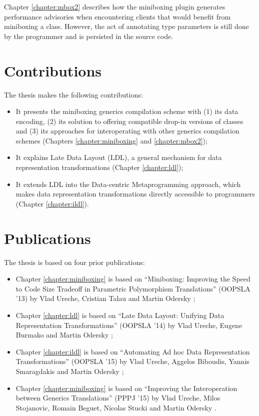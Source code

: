 Chapter \ref{chapter:mbox2} describes how the miniboxing plugin generates performance advisories when encountering clients that would benefit from miniboxing a class. However, the act of annotating type parameters is still done by the programmer and is persisted in the source code.

\section{Contributions}

The thesis makes the following contributions:

\begin{itemize}
  \item It presents the miniboxing generics compilation scheme with (1) its data encoding, (2) its solution to offering compatible drop-in versions of classes and (3) its approaches for interoperating with other generics compilation schemes (Chapters \ref{chapter:miniboxing} and \ref{chapter:mbox2});
  \item It explains Late Data Layout (LDL), a general mechanism for data representation transformations (Chapter \ref{chapter:ldl});
  \item It extends LDL into the Data-centric Metaprogramming approach, which makes data representation transformations directly accessible to programmers (Chapter \ref{chapter:ildl}).
\end{itemize}

\section{Publications}

The thesis is based on four prior publications:

\begin{itemize}
  \item Chapter \ref{chapter:miniboxing} is based on ``Miniboxing: Improving the Speed to Code Size Tradeoff in Parametric Polymorphism Translations'' (OOPSLA '13) by Vlad Ureche, Cristian Talau and Martin Odersky \cite{miniboxing};
  \item Chapter \ref{chapter:ldl} is based on ``Late Data Layout: Unifying Data Representation Transformations'' (OOPSLA '14) by Vlad Ureche, Eugene Burmako and Martin Odersky \cite{ldl};
  \item Chapter \ref{chapter:ildl} is based on ``Automating Ad hoc Data Representation Transformations'' (OOPSLA '15) by Vlad Ureche, Aggelos Biboudis, Yannis Smaragdakis and Martin Odersky \cite{ildl-tech};
  \item Chapter \ref{chapter:miniboxing} is based on ``Improving the Interoperation between Generics Translations'' (PPPJ '15) by Vlad Ureche, Milos Stojanovic, Romain Beguet, Nicolas Stucki and Martin Odersky \cite{miniboxing-pppj}.
\end{itemize}


